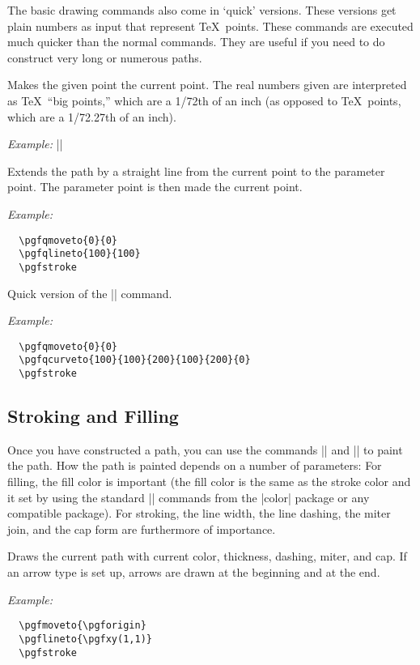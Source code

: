 \documentclass{ltxdoc}
\def\example{\par\smallskip\noindent\textit{Example: }}
\begin{document}
The basic drawing commands also come in `quick' versions. These
versions get plain numbers as input that represent \TeX\ points. These
commands are executed much quicker than the normal commands. They are
useful if you need to do construct very long or numerous paths.

\begin{command}{\pgfqmoveto{}}
  Makes the given point the current point. The real numbers given are
  interpreted as \TeX\ ``big points,'' which are a 1/72th of an inch
  (as opposed to \TeX\ points, which are a 1/72.27th of an inch).
  \example ||
\end{command}

\begin{command}{\pgfqlineto{}}
  Extends the path by a straight line from the current point to the
  parameter point. The parameter point is then made the current
  point.
  \example
\begin{verbatim}
  \pgfqmoveto{0}{0}
  \pgfqlineto{100}{100}
  \pgfstroke
\end{verbatim}
\end{command}

\begin{command}{\pgfqcurveto{}}
  Quick version of the |\pgfcurveto| command.
  \example
\begin{verbatim}
  \pgfqmoveto{0}{0}
  \pgfqcurveto{100}{100}{200}{100}{200}{0}
  \pgfstroke
\end{verbatim}
\end{command}



\subsection{Stroking and Filling}

Once you have constructed a path, you can use the commands
|\pgfstroke| and |\pgffill| to paint the path. How the
path is painted depends on a number of parameters: For filling, the
fill color is important (the fill color is the same as the stroke
color and it set by using the standard |\color| commands from the
|color| package or any compatible package). For stroking, the
line width, the line dashing, the miter join, and the cap form are
furthermore of importance.

\begin{command}{\pgfstroke}
  Draws the current path with current color, thickness, dashing,
  miter, and cap. If an arrow type is set up, arrows are drawn at the
  beginning and at the end.
  \example
\begin{verbatim}
  \pgfmoveto{\pgforigin}
  \pgflineto{\pgfxy(1,1)}
  \pgfstroke
\end{verbatim}
\end{command}
\end{document}
